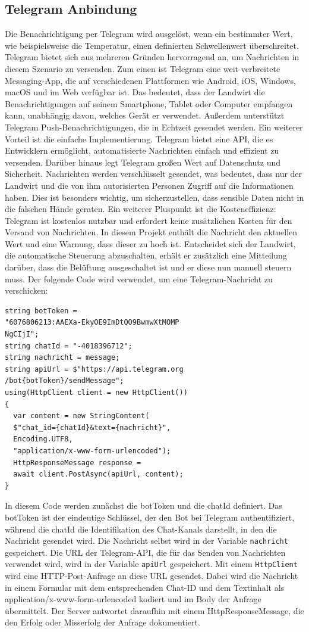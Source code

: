 \documentclass[conference]{IEEEtran}
\begin{document}
\subsection{Telegram Anbindung}
Die Benachrichtigung per Telegram wird ausgelöst, wenn ein bestimmter Wert, wie beispielsweise die Temperatur, einen definierten Schwellenwert überschreitet. Telegram bietet sich aus mehreren Gründen hervorragend an, um Nachrichten in diesem Szenario zu versenden. Zum einen ist Telegram eine weit verbreitete Messaging-App, die auf verschiedenen Plattformen wie Android, iOS, Windows, macOS und im Web verfügbar ist. Das bedeutet, dass der Landwirt die Benachrichtigungen auf seinem Smartphone, Tablet oder Computer empfangen kann, unabhängig davon, welches Gerät er verwendet. Außerdem unterstützt Telegram Push-Benachrichtigungen, die in Echtzeit gesendet werden. Ein weiterer Vorteil ist die einfache Implementierung. Telegram bietet eine API,  die es Entwicklern ermöglicht, automatisierte Nachrichten einfach und effizient zu versenden. Darüber hinaus legt Telegram großen Wert auf Datenschutz und Sicherheit. Nachrichten werden verschlüsselt gesendet, was bedeutet, dass nur der Landwirt und die von ihm autorisierten Personen Zugriff auf die Informationen haben. Dies ist besonders wichtig, um sicherzustellen, dass sensible Daten nicht in die falschen Hände geraten. Ein weiterer Pluspunkt ist die Kosteneffizienz: Telegram ist kostenlos nutzbar und erfordert keine zusätzlichen Kosten für den Versand von Nachrichten.
In diesem Projekt enthält die Nachricht den aktuellen Wert und eine Warnung, dass dieser zu hoch ist. Entscheidet sich der Landwirt, die automatische Steuerung abzuschalten, erhält er zusätzlich eine Mitteilung darüber, dass die Belüftung ausgeschaltet ist und er diese nun manuell steuern muss.
Der folgende Code wird verwendet, um eine Telegram-Nachricht zu verschicken:
\begin{verbatim}
string botToken = 
"6076806213:AAEXa-EkyOE9ImDtQO9BwmwXtMOMP
NgCIjI";
string chatId = "-4018396712";
string nachricht = message;
string apiUrl = $"https://api.telegram.org
/bot{botToken}/sendMessage";
using(HttpClient client = new HttpClient())
{
  var content = new StringContent(
  $"chat_id={chatId}&text={nachricht}", 
  Encoding.UTF8, 
  "application/x-www-form-urlencoded");
  HttpResponseMessage response = 
  await client.PostAsync(apiUrl, content);
}
\end{verbatim}
In diesem Code werden zunächst die botToken und die chatId definiert. Das botToken ist der eindeutige Schlüssel, der den Bot bei Telegram authentifiziert, während die chatId die Identifikation des Chat-Kanals darstellt, in den die Nachricht gesendet wird. Die Nachricht selbst wird in der Variable \texttt{nachricht} gespeichert.
Die URL der Telegram-API, die für das Senden von Nachrichten verwendet wird, wird in der Variable \texttt{apiUrl} gespeichert. Mit einem \texttt{HttpClient} wird eine HTTP-Post-Anfrage an diese URL gesendet. Dabei wird die Nachricht in einem Formular mit dem entsprechenden Chat-ID und dem Textinhalt als application/x-www-form-urlencoded kodiert und im Body der Anfrage übermittelt. Der Server antwortet daraufhin mit einem HttpResponseMessage, die den Erfolg oder Misserfolg der Anfrage dokumentiert.
\end{document}
